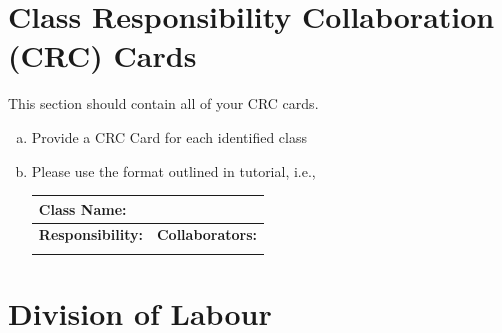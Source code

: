 \documentclass[]{article}
\begin{document}

	
\section{Class Responsibility Collaboration (CRC) Cards}
\label{sec:class_responsibility_collaboration_crc_cards}
This section should contain all of your CRC cards.

\begin{enumerate}[a)]
	\item Provide a CRC Card for each identified class
	\item Please use the format outlined in tutorial, i.e., 
	\begin{table}[ht]
		\centering
		\begin{tabular}{|p{5cm}|p{5cm}|}
		\hline 
		 \multicolumn{2}{|l|}{\textbf{Class Name:}} \\
		\hline
		\textbf{Responsibility:} & \textbf{Collaborators:} \\
		\hline
		\vspace{1in} & \\
		\hline
		\end{tabular}
	\end{table}
	
\end{enumerate}

\appendix
\newpage
\section{Division of Labour}
\label{sec:division_of_labour}
\end{document}
